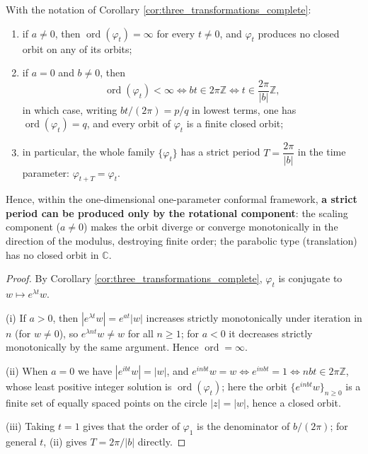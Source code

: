 \begin{corollary}\label{cor:period_only_from_rotation}
With the notation of Corollary \ref{cor:three_transformations_complete}:
\begin{enumerate}[label=(\roman*)]
    \item if $a\neq0$, then $\operatorname{ord}(\varphi_t)=\infty$ for every $t\neq0$, and $\varphi_t$ produces no closed orbit on any of its orbits;
    \item if $a=0$ and $b\neq0$, then
    \[
    \operatorname{ord}(\varphi_t)<\infty\iff bt\in2\pi\mathbb Z\iff t\in\frac{2\pi}{|b|}\mathbb Z ,
    \]
    in which case, writing $bt/(2\pi)=p/q$ in lowest terms, one has $\operatorname{ord}(\varphi_t)=q$, and every orbit of $\varphi_t$ is a finite closed orbit;
    \item in particular, the whole family $\{\varphi_t\}$ has a strict period $T=\dfrac{2\pi}{|b|}$ in the time parameter: $\varphi_{t+T}=\varphi_t$.
\end{enumerate}
Hence, within the one-dimensional one-parameter conformal framework, \textbf{a strict period can be produced only by the rotational component}: the scaling component ($a\neq0$) makes the orbit diverge or converge monotonically in the direction of the modulus, destroying finite order; the parabolic type (translation) has no closed orbit in $\mathbb C$.
\end{corollary}

\begin{proof}
By Corollary \ref{cor:three_transformations_complete}, $\varphi_t$ is conjugate to $w\mapsto e^{\lambda t}w$.

(i) If $a>0$, then $|e^{\lambda t}w|=e^{at}|w|$ increases strictly monotonically under iteration in $n$ (for $w\neq0$), so $e^{\lambda nt}w\neq w$ for all $n\ge1$; for $a<0$ it decreases strictly monotonically by the same argument. Hence $\operatorname{ord}=\infty$.

(ii) When $a=0$ we have $|e^{ibt}w|=|w|$, and $e^{inbt}w=w\iff e^{inbt}=1\iff nbt\in2\pi\mathbb Z$, whose least positive integer solution is $\operatorname{ord}(\varphi_t)$; here the orbit $\{e^{inbt}w\}_{n\ge0}$ is a finite set of equally spaced points on the circle $|z|=|w|$, hence a closed orbit.

(iii) Taking $t=1$ gives that the order of $\varphi_1$ is the denominator of $b/(2\pi)$; for general $t$, (ii) gives $T=2\pi/|b|$ directly.
\end{proof}

